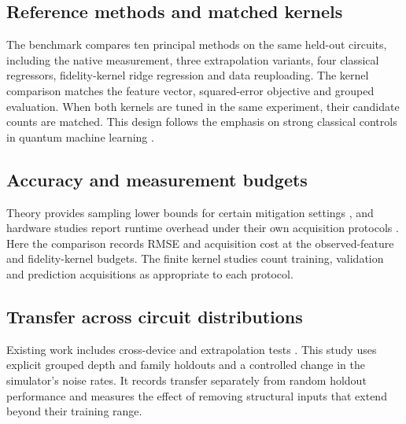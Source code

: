 \documentclass[Thesis.tex]{subfiles}
\begin{document}
\subsection{Reference methods and matched kernels}

The benchmark compares ten principal methods on the same held-out circuits,
including the native measurement, three extrapolation variants, four classical
regressors, fidelity-kernel ridge regression and data reuploading.
The kernel comparison matches the feature vector, squared-error objective
and grouped evaluation. When both kernels are tuned in the same experiment,
their candidate counts are matched. This design follows the emphasis on
strong classical controls in quantum machine learning
\cite{bowles2024better}.

\subsection{Accuracy and measurement budgets}

Theory provides sampling lower bounds for certain mitigation settings
\cite{takagi2022fundamental,quek2024exponentially}, and hardware studies
report runtime overhead under their own acquisition protocols
\cite{liao2024machine}. Here the comparison records RMSE and acquisition
cost at the observed-feature and fidelity-kernel budgets. The finite
kernel studies count training, validation and prediction acquisitions as
appropriate to each protocol.

\subsection{Transfer across circuit distributions}

Existing work includes cross-device and extrapolation tests
\cite{zlokapa2020deep,liao2024machine}. This study uses explicit grouped
depth and family holdouts and a controlled change in the simulator's noise
rates. It records transfer separately from random holdout performance
and measures the effect of removing structural inputs that extend beyond
their training range.
\end{document}
